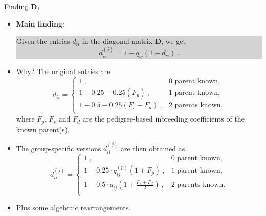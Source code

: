 \documentclass[10pt,ignorenonframetext,]{beamer}
\providecommand{\tightlist}{%
  \setlength{\itemsep}{0pt}\setlength{\parskip}{0pt}}
\begin{document}
\begin{frame}

\begin{block}{Finding \(\mathbf{D}_j\)}

\vspace{3mm}

\begin{itemize}
\tightlist
\item
  \textbf{Main finding}:

  \colorbox{lightgray}{\begin{minipage}{10cm}
  Given the entries $d_{ii}$ in the diagonal matrix $\mathbf{D}$, we get
  $$d^{(j)}_{ii} = 1 - q_{ij}(1-d_{ii}) \ .$$
  \end{minipage}}
\end{itemize}

\vspace{2mm}
\small

\begin{itemize}
\tightlist
\item
  Why? The original entries are \begin{equation*}
  d_{ii} = 
   \left\{\begin{array}{ll}
       1 \ , & \text{0 parent known},\\

       1-  0.25  - 0.25 (F_{p})\ , & \text{1 parent known},\\
       1 - 0.5 -  0.25 (F_{s} + F_{d}) \ , & \text{2 parents known}. \\
        \end{array}\right.
  \end{equation*} where \(F_p\), \(F_s\) and \(F_d\) are the
  pedigree-based inbreeding coefficients of the known parent(s).
\end{itemize}

\vspace{1mm}

\begin{itemize}
\tightlist
\item
  The group-specific versions \(d^{(j)}_{ii}\) are then obtained as
  \begin{equation*}
  d^{(j)}_{ii} =
  \left\{\begin{array}{ll}
       1 \ , & \text{0 parent known},\\
       1-  0.25 \cdot q_{ij}^{(p)} (1 + F_{p})\ , & \text{1 parent known},\\
       1 - 0.5 \cdot q_{ij} (1 +  \frac{F_{s} + F_{d}}{2}) \ , & \text{2 parents known}. \\
        \end{array}\right.
  \end{equation*}
\item
  Plus some algebraic rearrangements.
\end{itemize}

\end{block}

\end{frame}
\end{document}
